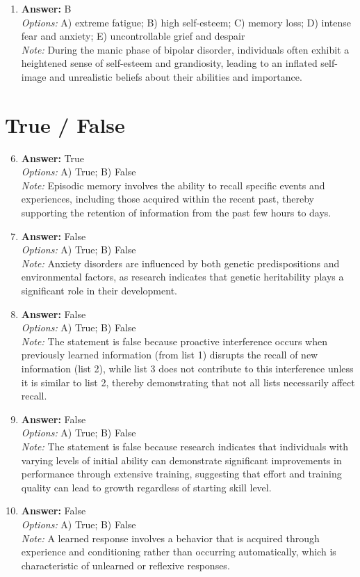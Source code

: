 \documentclass[12pt]{article}
\begin{document}
\begin{enumerate}[label=\arabic*.]
\item \textbf{Answer:} B
\\ \textit{Options:} A) extreme fatigue; B) high self-esteem; C) memory loss; D) intense fear and anxiety; E) uncontrollable grief and despair
\\ \textit{Note:} During the manic phase of bipolar disorder, individuals often exhibit a heightened sense of self-esteem and grandiosity, leading to an inflated self-image and unrealistic beliefs about their abilities and importance.
\end{enumerate}

\section*{True / False}
\begin{enumerate}[label=\arabic*.]
\setcounter{enumi}{5}
\item \textbf{Answer:} True
\\ \textit{Options:} A) True; B) False
\\ \textit{Note:} Episodic memory involves the ability to recall specific events and experiences, including those acquired within the recent past, thereby supporting the retention of information from the past few hours to days.
\item \textbf{Answer:} False
\\ \textit{Options:} A) True; B) False
\\ \textit{Note:} Anxiety disorders are influenced by both genetic predispositions and environmental factors, as research indicates that genetic heritability plays a significant role in their development.
\item \textbf{Answer:} False
\\ \textit{Options:} A) True; B) False
\\ \textit{Note:} The statement is false because proactive interference occurs when previously learned information (from list 1) disrupts the recall of new information (list 2), while list 3 does not contribute to this interference unless it is similar to list 2, thereby demonstrating that not all lists necessarily affect recall.
\item \textbf{Answer:} False
\\ \textit{Options:} A) True; B) False
\\ \textit{Note:} The statement is false because research indicates that individuals with varying levels of initial ability can demonstrate significant improvements in performance through extensive training, suggesting that effort and training quality can lead to growth regardless of starting skill level.
\item \textbf{Answer:} False
\\ \textit{Options:} A) True; B) False
\\ \textit{Note:} A learned response involves a behavior that is acquired through experience and conditioning rather than occurring automatically, which is characteristic of unlearned or reflexive responses.
\end{enumerate}
\end{document}
